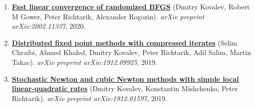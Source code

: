 \begin{enumerate}
\item
\textbf{\href{https://arxiv.org/abs/2002.11337}{Fast linear convergence of randomized BFGS}} (Dmitry Kovalev, Robert M Gower, Peter Richtarik, Alexander Rogozin). \textit{arXiv preprint arXiv:2002.11337}, 2020.
\item
\textbf{\href{https://arxiv.org/abs/1912.09925}{Distributed fixed point methods with compressed iterates}} (Selim Chraibi, Ahmed Khaled, Dmitry Kovalev, Peter Richtarik, Adil Salim, Martin Takac). \textit{arXiv preprint arXiv:1912.09925}, 2019.
\item
\textbf{\href{https://arxiv.org/abs/1912.01597}{Stochastic Newton and cubic Newton methods with simple local linear-quadratic rates}} (Dmitry Kovalev, Konstantin Mishchenko, Peter Richtarik). \textit{arXiv preprint arXiv:1912.01597}, 2019.
\end{enumerate}
